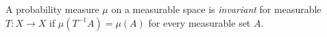 
A probability measure $\mu$ on a measurable space is \emph{invariant} for measurable $T:X\to X$ if $\mu(T^{-1}A)=\mu(A)$ for every measurable set $A$.
